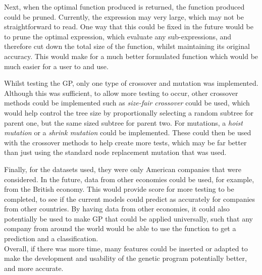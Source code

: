 \documentclass[11pt]{article}
\begin{document}
Next, when the optimal function produced is returned, the function produced could be pruned. Currently, the expression may very large, which may not be straightforward to read. One way that this could be fixed in the future would be to prune the optimal expression, which evaluate any sub-expressions, and therefore cut down the total size of the function, whilst maintaining its original accuracy. This would make for a much better formulated function which would be much easier for a user to and use. 

Whilst testing the GP, only one type of crossover and mutation was implemented. Although this was sufficient, to allow more testing to occur, other crossover methods could be implemented such as \textit{size-fair crossover} could be used, which would help control the tree size by proportionally selecting a random subtree for parent one, but the same sized subtree for parent two. For mutations, a \textit{hoist mutation} or a \textit{shrink mutation} could be implemented. These could then be used with the crossover methods to help create more tests, which may be far better than just using the standard node replacement mutation that was used. 

Finally, for the datasets used, they were only American companies that were considered. In the future, data from other economies could be used, for example, from the British economy. This would provide score for more testing to be completed, to see if the current models could predict as accurately for companies from other countries. By having data from other economies, it could also potentially be used to make GP that could be applied universally, such that any company from around the world would be able to use the function to get a prediction and a classification. \\

Overall, if there was more time, many features could be inserted or adapted to make the development and usability of the genetic program potentially better, and more accurate.
\end{document}
